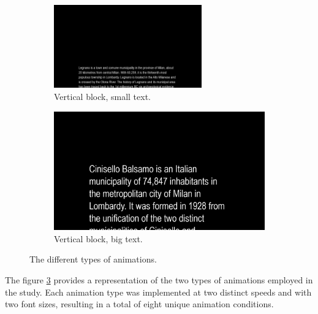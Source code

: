 \documentclass[12pt]{report}
\begin{document}
\begin{figure}[ht]
    \begin{subfigure}[b]{0.45\textwidth}
        \centering
        \includegraphics[width=0.7\textwidth,height=0.6\textwidth]{Images/Experiment/VB_little.png}
        \caption{Vertical block, small text.}
        \label{fig:VB_L}
    \end{subfigure}
    \hfill
    \begin{subfigure}[b]{0.45\textwidth}
        \centering
        \includegraphics[width=1\textwidth,height=0.6\textwidth]{Images/Experiment/VB_big.png}
        \caption{Vertical block, big text.}
        \label{fig:VB_B}
    \end{subfigure}

    \caption{The different types of animations.}
    \label{fig:anims}
\end{figure}

The figure \ref{fig:anims} provides a representation of the two types of animations employed in the study. 
Each animation type was implemented at two distinct speeds and with two font sizes, resulting in a total of eight unique animation conditions.
\FloatBarrier
\end{document}
